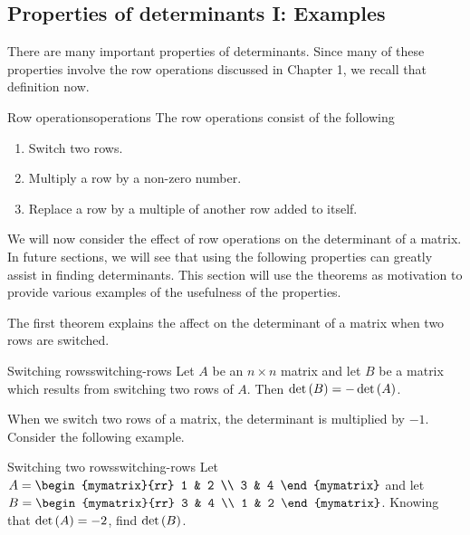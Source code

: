 \subsection{Properties of determinants I: Examples}

There are many important properties of determinants. Since many of these properties involve
the row operations discussed in Chapter 1, we recall that definition now. 

\begin{definition}{Row operations}{operations}
The row operations
consist of the following

\begin{enumerate}
\item Switch two rows.

\item Multiply a row by a non-zero number.

\item Replace a row by a multiple of another row added to itself.
\end{enumerate}
\end{definition}

We will now consider the effect of row operations on the determinant of a matrix. In future sections, we will see that using the following properties can 
greatly assist in finding determinants. This section will use the theorems as motivation to provide various examples of the usefulness of the properties. 

The first theorem explains the affect on the determinant of a matrix when two rows are switched. 

\begin{theorem}{Switching rows}{switching-rows}
Let $A$ be an $n\times n$ matrix and let $B$ be a matrix
which results from switching two rows of $A$. Then $\det \left(B\right)
= - \det \left(A\right)$. 
\end{theorem}

When we switch two rows of a matrix, the determinant is multiplied by $-1$. Consider the following example.

\begin{example}{Switching two rows}{switching-rows}
Let $A=\begin{mymatrix}{rr}
1 & 2 \\
3 & 4
\end{mymatrix} $ and let $B=\begin{mymatrix}{rr}
3 & 4 \\
1 & 2
\end{mymatrix}$. 
Knowing that $\det \left(A \right) =-2$, find $\det \left(B \right) $.
\end{example}

